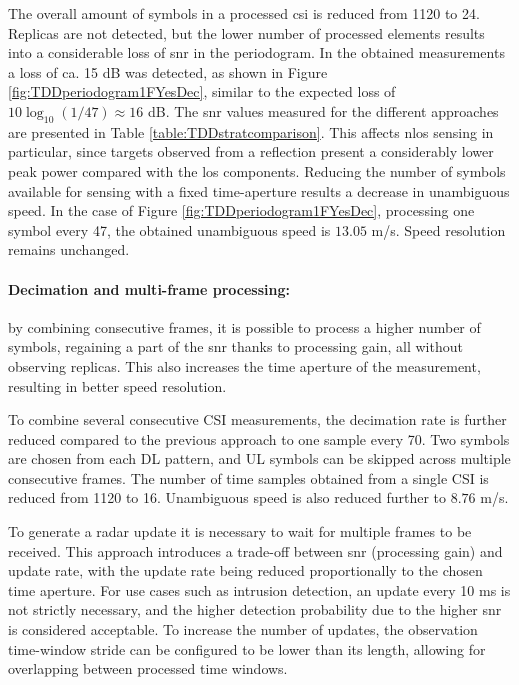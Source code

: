 		     The overall amount of symbols in a processed \gls{csi} is reduced from 1120 to 24.
		     Replicas are not detected, but the lower number of processed elements results into a considerable loss of \gls{snr} in the periodogram. In the obtained measurements a loss of ca. 15 dB was detected, as shown in Figure \ref{fig:TDDperiodogram1FYesDec}, similar to the expected loss of $10\log_{10}(1/47) \approx 16$ dB.
		     The \gls{snr} values measured for the different approaches are presented in Table \ref{table:TDDstratcomparison}. 
		     This affects \gls{nlos} sensing in particular, since targets observed from a reflection present a considerably lower peak power compared with the \gls{los} components.
		     Reducing the number of symbols available for sensing with a fixed time-aperture results a decrease in unambiguous speed. In the case of Figure \ref{fig:TDDperiodogram1FYesDec}, processing one symbol every 47, the obtained unambiguous speed is $13.05$ m/s. Speed resolution remains unchanged.
		    
		     \paragraph{Decimation and multi-frame processing:}
		     by combining consecutive frames, it is possible to process a higher number of symbols, regaining a part of the \gls{snr} thanks to processing gain, all without observing replicas. 
		     This also increases the time aperture of the measurement, resulting in better speed resolution.
		     
			 To combine several consecutive CSI measurements, the decimation rate is further reduced compared to the previous approach to one sample every 70. 
			 Two symbols are chosen from each DL pattern, and UL symbols can be skipped across multiple consecutive frames.
			 The number of time samples obtained from a single CSI is reduced from 1120 to 16.
			 Unambiguous speed is also reduced further to $8.76$ m/s.
			 
			 To generate a radar update it is necessary to wait for multiple frames to be received.
			 This approach introduces a trade-off between \gls{snr} (processing gain) and update rate, with the update rate being reduced proportionally to the chosen time aperture.
		     For use cases such as intrusion detection, an update every 10 ms is not strictly necessary, and the higher detection probability due to the higher \gls{snr} is considered acceptable.
		     To increase the number of updates, the observation time-window stride can be configured to be lower than its length, allowing for overlapping between processed time windows.
		      
